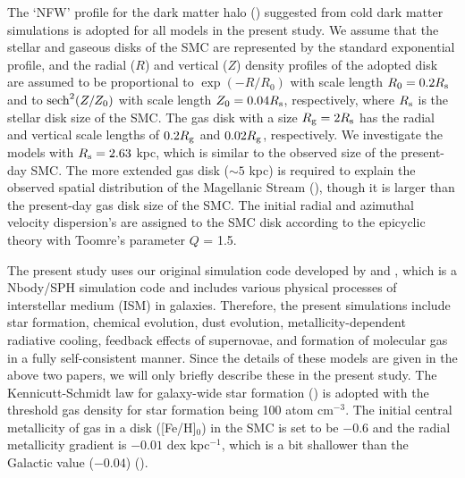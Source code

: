 \documentclass[fleqn,usenatbib]{mnras}
\begin{document}
The `NFW' profile for the dark matter halo (\citealt{K4_Navarro_Frenk_White1996}) suggested from cold dark matter simulations is adopted for all models in the present study. We assume that the stellar and gaseous disks of the SMC are represented by the standard exponential profile, and the radial ($R$) and vertical ($Z$) density profiles of the adopted disk are
assumed to be proportional to $\exp (-R/R_{0}) $ with scale length $R_{0} = 0.2R_{\rm s}$  and to ${\rm sech}^2 (Z/Z_{0})$ with scale length $Z_{0} = 0.04R_{\rm s}$, respectively, where $R_{\rm s}$ is the stellar disk size of the SMC.
The gas disk with a size  $R_{\rm g}=2R_{\rm s}$
has the  radial and vertical scale lengths
of $0.2R_{\rm g}$ and $0.02R_{\rm g}$, respectively.
We investigate the models with $R_{\rm s}=2.63$ kpc,
which is similar to the observed size of the present-day SMC.
The more extended gas disk (${\sim} 5$ kpc) is required to explain the observed spatial distribution of the Magellanic Stream (\citealt{K3_Diaz_Bekki2012}), though it is larger than the present-day gas disk size of the SMC. 
The initial radial and azimuthal velocity dispersion's are assigned to the SMC disk according to the epicyclic theory with Toomre's parameter $Q$ = 1.5.



The present study uses our original simulation code developed by \cite{K5_Bekki2013} and \cite{K6_Bekki2015}, which is a Nbody/SPH simulation code and includes various physical processes of interstellar medium (ISM) in galaxies. 
Therefore, the present simulations include
star formation, chemical evolution, dust evolution, metallicity-dependent radiative cooling, feedback effects of supernovae, and formation of molecular gas in a fully self-consistent manner.
Since the details of these models are given in the above two papers, we will only briefly describe these in the present study.
The Kennicutt-Schmidt law for galaxy-wide star formation
(\citealt{K7_Kennicutt1998}) is adopted with the threshold gas density for star formation being 100 atom cm$^{-3}$. The initial central metallicity of gas in a disk ([Fe/H]$_0$) in the SMC is set to be $-0.6$  and the radial metallicity gradient is $-0.01$ dex kpc$^{-1}$,
which is a bit shallower than the Galactic value ($-0.04$) (\citealt{K22_Choudhury_et_al2018}). 
\end{document}
